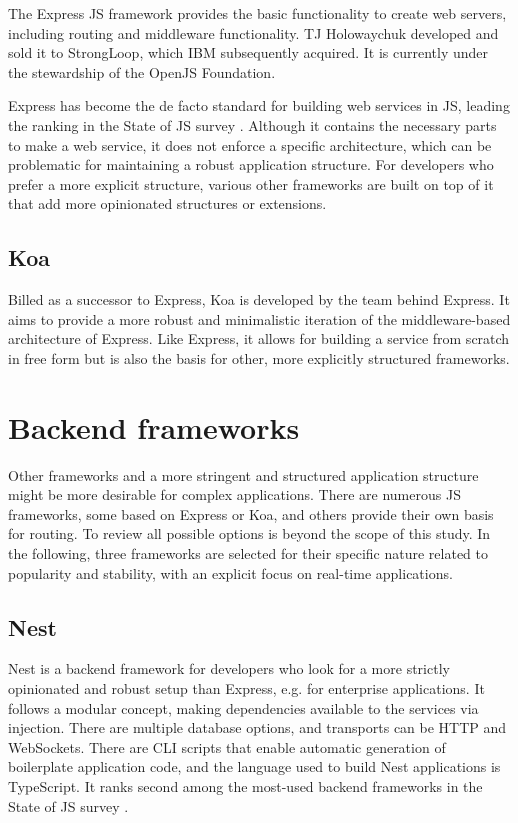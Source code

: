 The Express JS framework provides the basic functionality to create web servers, including routing and middleware functionality. TJ Holowaychuk developed and sold it to StrongLoop, which IBM subsequently acquired. It is currently under the stewardship of the OpenJS Foundation.

Express has become the de facto standard for building web services in JS, leading the ranking in the State of JS survey \parencite{mostUsedBackendFrameworks22}. Although it contains the necessary parts to make a web service, it does not enforce a specific architecture, which can be problematic for maintaining a robust application structure. For developers who prefer a more explicit structure, various other frameworks are built on top of it that add more opinionated structures or extensions.

\subsection{Koa}

Billed as a successor to Express, Koa is developed by the team behind Express. It aims to provide a more robust and minimalistic iteration of the middleware-based architecture of Express. Like Express, it allows for building a service from scratch in free form but is also the basis for other, more explicitly structured frameworks.


\section{Backend frameworks}

Other frameworks and a more stringent and structured application structure might be more desirable for complex applications. There are numerous \ac{JS} frameworks, some based on Express or Koa, and others provide their own basis for routing. To review all possible options is beyond the scope of this study. In the following, three frameworks are selected for their specific nature related to popularity and stability, with an explicit focus on real-time applications.



\subsection{Nest}

Nest is a backend framework for developers who look for a more strictly opinionated and robust setup than Express, e.g. for enterprise applications. It follows a modular concept, making dependencies available to the services via injection. There are multiple database options, and transports can be HTTP and WebSockets. There are \ac{CLI} scripts that enable automatic generation of boilerplate application code, and the language used to build Nest applications is TypeScript. It ranks second among the most-used backend frameworks in the State of JS survey \parencite{mostUsedBackendFrameworks22}.

